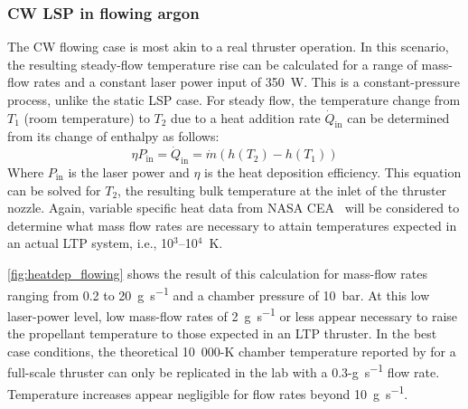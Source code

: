             \subsubsection*{CW LSP in flowing argon}
                The CW flowing case is most akin to a real thruster operation. In this scenario, the resulting steady-flow temperature rise can be calculated for a range of mass-flow rates and a constant laser power input of \qty{350}{W}. This is a constant-pressure process, unlike the static LSP case. For steady flow, the temperature change from $T_1$ (room temperature) to $T_2$ due to a heat addition rate $\dot{Q}_\mathrm{in}$ can be determined from its change of enthalpy as follows:
                \begin{equation}
                    \eta P_\mathrm{in} = \dot{Q}_\mathrm{in} = \dot{m}(h(T_2)-h(T_1))
                \end{equation}
                Where $P_\mathrm{in}$ is the laser power and $\eta$ is the heat deposition efficiency. This equation can be solved for $T_2$, the resulting bulk temperature at the inlet of the thruster nozzle. Again, variable specific heat data from NASA CEA~\cite{gordonComputerProgramCalculation1994} will be considered to determine what mass flow rates are necessary to attain temperatures expected in an actual LTP system, i.e., 10$^3$--10$^4$~K.

                \autoref{fig:heatdep_flowing} shows the result of this calculation for mass-flow rates ranging from 0.2 to \qty{20}{g.s^{-1}} and a chamber pressure of \qty{10}{bar}. At this low laser-power level, low mass-flow rates of \qty{2}{g.s^{-1}} or less appear necessary to raise the propellant temperature to those expected in an LTP thruster. In the best case conditions, the theoretical 10~000-K chamber temperature reported by \textcite{duplayDesignRapidTransit2022} for a full-scale thruster can only be replicated in the lab with a 0.3-\unit{g.s^{-1}} flow rate. Temperature increases appear negligible for flow rates beyond \qty{10}{g.s^{-1}}.

